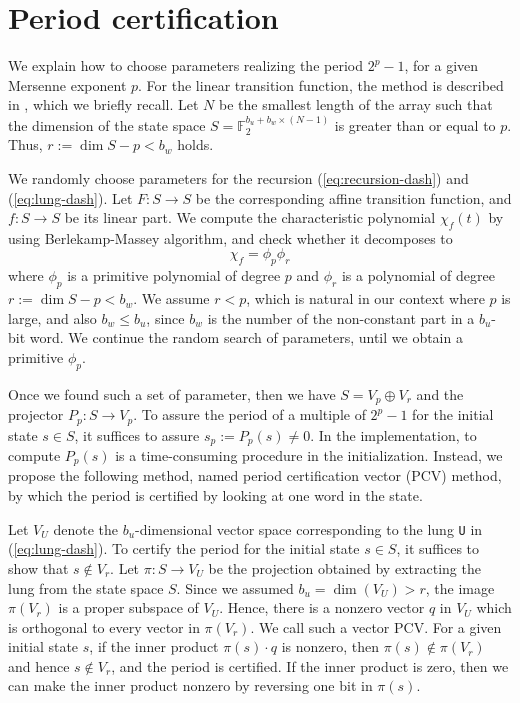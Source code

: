 \documentclass{svmult}
\begin{document}
\section{Period certification}
\label{sec:PCV}
We explain how to choose parameters
realizing the period $2^p-1$, for a given
Mersenne exponent $p$.
For the linear transition function, the method is
described in \cite{SFMT}, which we briefly
recall.
Let
$N$ be the smallest length of the array such that
the dimension of the state space
$S={\mathbb F}_2^{b_u + b_w \times (N-1)}$
is greater than or equal to $p$. Thus,
$r:=\dim S - p < b_w$ holds.

We randomly choose parameters for the recursion
(\ref{eq:recursion-dash}) and
(\ref{eq:lung-dash}). Let $F:S \to S$ be the
corresponding affine transition function, and $f:S \to S$ be
its linear part. We compute the characteristic
polynomial $\chi_f(t)$ by using Berlekamp-Massey algorithm, and
check whether it decomposes to
\[
\chi_f=\phi_p \phi_r
\]
where $\phi_p$ is a primitive polynomial of degree $p$
and $\phi_r$ is a polynomial of degree %
$r:=\dim S -p < b_w$. We assume $r<p$, which is natural
in our context where $p$ is large, and also $b_w\leq b_u$,
since $b_w$ is the number of the non-constant part in
a $b_u$-bit word.
We continue the random search of parameters,
until we obtain a primitive $\phi_p$.

Once we found such a set of parameter, then we have
$S=V_p \oplus V_r$ and the projector $P_p: S \to V_p$.
To assure the period of a multiple of $2^p-1$ for the initial state $s \in S$,
it suffices to assure $s_p:=P_p (s) \neq 0$.
In the implementation, to compute $P_p(s)$ is a time-consuming
procedure in the initialization. Instead, we propose the
following method, named period certification vector (PCV) method,
by which the period is certified by looking at one word in the state.

Let $V_U$ denote the $b_u$-dimensional vector space corresponding to the lung
\texttt{U} in (\ref{eq:lung-dash}). To certify the period for
the initial state $s \in S$, it suffices to show that
$s \notin V_r$. Let $\pi:S \to V_U$ be the projection obtained
by extracting the lung from the state space $S$. Since we assumed
$b_u=\dim (V_U)>r$, the image $\pi (V_r)$ is a proper subspace of $V_U$.
Hence, there is a nonzero vector $q$ in $V_U$ which is orthogonal
to every vector in $\pi (V_r)$. We call such a vector PCV.
For a given initial state $s$, if the inner product $\pi(s)\cdot q$ is nonzero,
then $\pi(s) \notin \pi(V_r)$ and hence $s \notin V_r$, and the period is certified. If
the inner product is zero, then we can make the inner product nonzero by reversing
one bit in $\pi(s)$.
\end{document}
